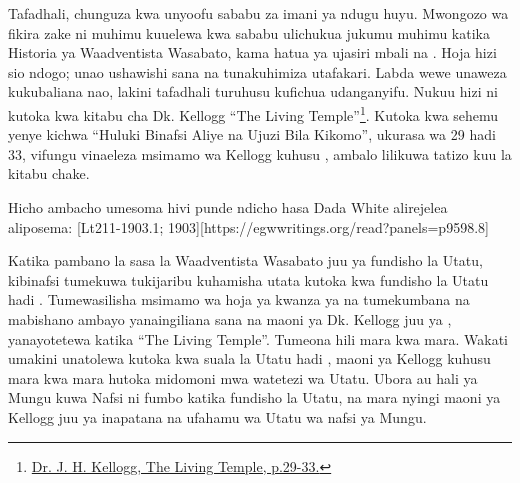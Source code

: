 Tafadhali, chunguza kwa unyoofu sababu za imani ya ndugu huyu. Mwongozo wa fikira zake ni muhimu kuuelewa kwa sababu ulichukua jukumu muhimu katika Historia ya Waadventista Wasabato, kama hatua ya ujasiri mbali na . Hoja hizi sio ndogo; unao ushawishi sana na tunakuhimiza utafakari. Labda wewe unaweza kukubaliana nao, lakini tafadhali turuhusu kufichua udanganyifu. Nukuu hizi ni kutoka kwa kitabu cha Dk. Kellogg “The Living Temple”\footnote{\href{https://archive.org/details/J.H.Kellogg.TheLivingTemple1903}{Dr. J. H. Kellogg, The Living Temple, p.29-33.}}. Kutoka kwa sehemu yenye kichwa “Huluki Binafsi Aliye na Ujuzi Bila Kikomo”, ukurasa wa 29 hadi 33, vifungu vinaeleza msimamo wa Kellogg kuhusu , ambalo lilikuwa tatizo kuu la kitabu chake.


Hicho ambacho umesoma hivi punde ndicho hasa Dada White alirejelea aliposema: [Lt211-1903.1; 1903][https://egwwritings.org/read?panels=p9598.8]


Katika pambano la sasa la Waadventista Wasabato juu ya fundisho la Utatu, kibinafsi tumekuwa tukijaribu kuhamisha utata kutoka kwa fundisho la Utatu hadi . Tumewasilisha msimamo wa hoja ya kwanza ya  na tumekumbana na mabishano ambayo yanaingiliana sana na maoni ya Dk. Kellogg juu ya , yanayotetewa katika “The Living Temple”. Tumeona hili mara kwa mara. Wakati umakini unatolewa kutoka kwa suala la Utatu hadi , maoni ya Kellogg kuhusu  mara kwa mara hutoka midomoni mwa watetezi wa Utatu. Ubora au hali ya Mungu kuwa Nafsi ni fumbo katika fundisho la Utatu, na mara nyingi maoni ya Kellogg juu ya  inapatana na ufahamu wa Utatu wa nafsi ya Mungu.


